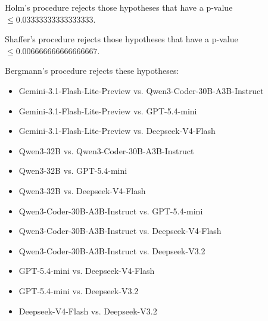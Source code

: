 \documentclass[a4paper,10pt]{article}
\begin{document}
\begin{landscape}
Holm's procedure rejects those hypotheses that have a p-value $\le0.03333333333333333$.


Shaffer's procedure rejects those hypotheses that have a p-value $\le0.006666666666666667$.


Bergmann's procedure rejects these hypotheses:


\begin{itemize}


\item Gemini-3.1-Flash-Lite-Preview vs. Qwen3-Coder-30B-A3B-Instruct
\item Gemini-3.1-Flash-Lite-Preview vs. GPT-5.4-mini
\item Gemini-3.1-Flash-Lite-Preview vs. Deepseek-V4-Flash
\item Qwen3-32B vs. Qwen3-Coder-30B-A3B-Instruct
\item Qwen3-32B vs. GPT-5.4-mini
\item Qwen3-32B vs. Deepseek-V4-Flash
\item Qwen3-Coder-30B-A3B-Instruct vs. GPT-5.4-mini
\item Qwen3-Coder-30B-A3B-Instruct vs. Deepseek-V4-Flash
\item Qwen3-Coder-30B-A3B-Instruct vs. Deepseek-V3.2
\item GPT-5.4-mini vs. Deepseek-V4-Flash
\item GPT-5.4-mini vs. Deepseek-V3.2
\item Deepseek-V4-Flash vs. Deepseek-V3.2
\end{itemize}



\end{landscape}
\end{document}
